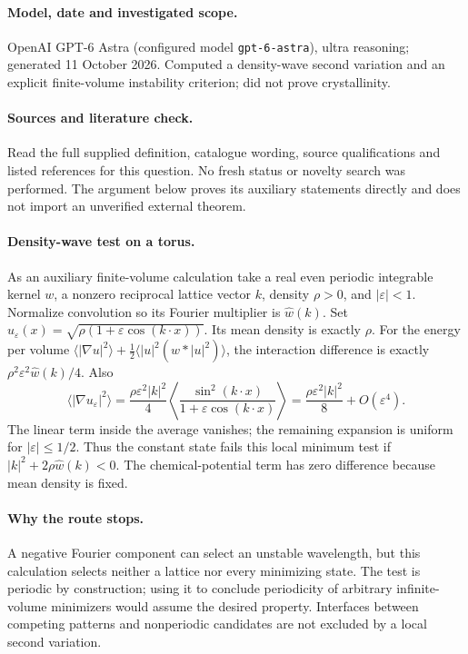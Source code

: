 \documentclass[11pt]{article}
\begin{document}
\paragraph{Model, date and investigated scope.}
OpenAI GPT-6 Astra (configured model \texttt{gpt-6-astra}), ultra reasoning; generated 11 October 2026. Computed a density-wave second variation and an explicit finite-volume instability criterion; did not prove crystallinity.

\paragraph{Sources and literature check.}
Read the full supplied definition, catalogue wording, source qualifications and listed references for this question. No fresh status or novelty search was performed. The argument below proves its auxiliary statements directly and does not import an unverified external theorem.

\paragraph{Density-wave test on a torus.} As an auxiliary finite-volume calculation take a real even periodic integrable kernel \(w\), a nonzero reciprocal lattice vector \(k\), density \(\rho>0\), and \(|\varepsilon|<1\). Normalize convolution so its Fourier multiplier is \(\widehat w(k)\). Set \(u_\varepsilon(x)=\sqrt{\rho(1+\varepsilon\cos(k\cdot x))}\). Its mean density is exactly \(\rho\). For the energy per volume \(\langle|\nabla u|^2\rangle+\frac12\langle|u|^2(w*|u|^2)\rangle\), the interaction difference is exactly \(\rho^2\varepsilon^2\widehat w(k)/4\). Also
\[
 \langle|\nabla u_\varepsilon|^2\rangle
 =\frac{\rho\varepsilon^2|k|^2}{4}
 \left\langle\frac{\sin^2(k\cdot x)}{1+\varepsilon\cos(k\cdot x)}\right\rangle
 =\frac{\rho\varepsilon^2|k|^2}{8}+O(\varepsilon^4).
\]
The linear term inside the average vanishes; the remaining expansion is uniform for \(|\varepsilon|\leq1/2\). Thus the constant state fails this local minimum test if \(|k|^2+2\rho\widehat w(k)<0\). The chemical-potential term has zero difference because mean density is fixed.
\paragraph{Why the route stops.} A negative Fourier component can select an unstable wavelength, but this calculation selects neither a lattice nor every minimizing state. The test is periodic by construction; using it to conclude periodicity of arbitrary infinite-volume minimizers would assume the desired property. Interfaces between competing patterns and nonperiodic candidates are not excluded by a local second variation.
\end{document}
